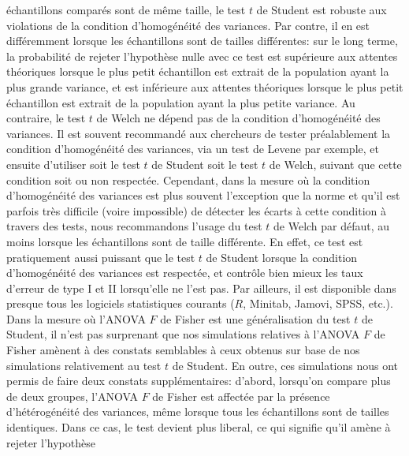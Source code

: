 \documentclass[
  12pt,
  french,
]{article}
\begin{document}
échantillons comparés sont de même taille, le test \(t\) de Student est
robuste aux violations de la condition d'homogénéité des variances. Par
contre, il en est différemment lorsque les échantillons sont de tailles
différentes: sur le long terme, la probabilité de rejeter l'hypothèse
nulle avec ce test est supérieure aux attentes théoriques lorsque le
plus petit échantillon est extrait de la population ayant la plus grande
variance, et est inférieure aux attentes théoriques lorsque le plus
petit échantillon est extrait de la population ayant la plus petite
variance. Au contraire, le test \(t\) de Welch ne dépend pas de la
condition d'homogénéité des variances. Il est souvent recommandé aux
chercheurs de tester préalablement la condition d'homogénéité des
variances, via un test de Levene par exemple, et ensuite d'utiliser soit
le test \(t\) de Student soit le test \(t\) de Welch, suivant que cette
condition soit ou non respectée. Cependant, dans la mesure où la
condition d'homogénéité des variances est plus souvent l'exception que
la norme et qu'il est parfois très difficile (voire impossible) de
détecter les écarts à cette condition à travers des tests, nous
recommandons l'usage du test \(t\) de Welch par défaut, au moins lorsque
les échantillons sont de taille différente. En effet, ce test est
pratiquement aussi puissant que le test \(t\) de Student lorsque la
condition d'homogénéité des variances est respectée, et contrôle bien
mieux les taux d'erreur de type I et II lorsqu'elle ne l'est pas. Par
ailleurs, il est disponible dans presque tous les logiciels statistiques
courants (\(R\), Minitab, Jamovi, SPSS, etc.). Dans la mesure où l'ANOVA
\(F\) de Fisher est une généralisation du test \(t\) de
Student,
il n'est pas surprenant que nos simulations relatives à l'ANOVA \(F\) de
Fisher amènent à des constats semblables à ceux obtenus sur base de nos
simulations relativement au test \(t\) de Student. En outre, ces
simulations nous ont permis de faire deux constats supplémentaires:
d'abord, lorsqu'on compare plus de deux groupes, l'ANOVA \(F\) de Fisher
est affectée par la présence d'hétérogénéité des variances, même lorsque
tous les échantillons sont de tailles identiques. Dans ce cas, le test
devient plus liberal, ce qui signifie qu'il amène à rejeter l'hypothèse
\end{document}
